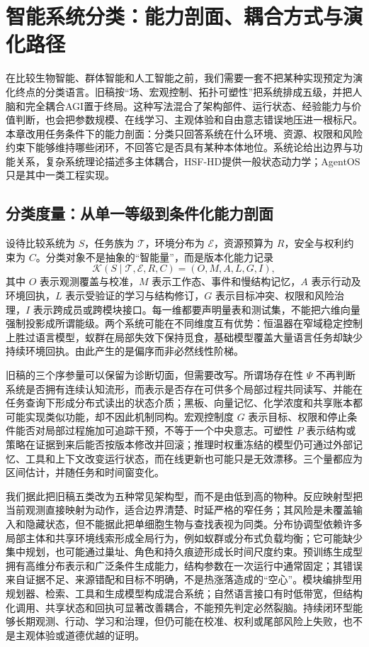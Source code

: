 \chapter{智能系统分类：能力剖面、耦合方式与演化路径}
\label{chp:evolutionary_taxonomy}

在比较生物智能、群体智能和人工智能之前，我们需要一套不把某种实现预定为演化终点的分类语言。旧稿按“场、宏观控制、拓扑可塑性”把系统排成五级，并把人脑和完全耦合AGI置于终局。这种写法混合了架构部件、运行状态、经验能力与价值判断，也会把参数规模、在线学习、主观体验和自由意志错误地压进一根标尺。本章改用任务条件下的能力剖面：分类只回答系统在什么环境、资源、权限和风险约束下能够维持哪些闭环，不回答它是否具有某种本体地位。系统论给出边界与功能关系，复杂系统理论描述多主体耦合，HSF-HD提供一般状态动力学；AgentOS只是其中一类工程实现。

\section{分类度量：从单一等级到条件化能力剖面}
\label{sec:section_1861}

设待比较系统为 $S$，任务族为 $\mathcal T$，环境分布为 $\mathcal E$，资源预算为 $R$，安全与权利约束为 $C$。分类对象不是抽象的“智能量”，而是版本化能力记录
\begin{equation}
 \mathcal K(S\mid\mathcal T,\mathcal E,R,C)=(O,M,A,L,G,I),
\end{equation}
其中 $O$ 表示观测覆盖与校准，$M$ 表示工作态、事件和慢结构记忆，$A$ 表示行动及环境回执，$L$ 表示受验证的学习与结构修订，$G$ 表示目标冲突、权限和风险治理，$I$ 表示跨成员或跨模块接口。每一维都要声明量表和测试集，不能把六维向量强制投影成所谓能级。两个系统可能在不同维度互有优势：恒温器在窄域稳定控制上胜过语言模型，蚁群在局部失效下保持觅食，基础模型覆盖大量语言任务却缺少持续环境回执。由此产生的是偏序而非必然线性阶梯。

旧稿的三个序参量可以保留为诊断切面，但需要改写。所谓场存在性 $\Psi$ 不再判断系统是否拥有连续认知流形，而表示是否存在可供多个局部过程共同读写、并能在任务查询下形成分布式读出的状态介质；黑板、向量记忆、化学浓度和共享账本都可能实现类似功能，却不因此机制同构。宏观控制度 $G$ 表示目标、权限和停止条件能否对局部过程施加可追踪干预，不等于一个中央意志。可塑性 $P$ 表示结构或策略在证据到来后能否按版本修改并回滚；推理时权重冻结的模型仍可通过外部记忆、工具和上下文改变运行状态，而在线更新也可能只是无效漂移。三个量都应为区间估计，并随任务和时间窗变化。

我们据此把旧稿五类改为五种常见架构型，而不是由低到高的物种。反应映射型把当前观测直接映射为动作，适合边界清楚、时延严格的窄任务；其风险是未覆盖输入和隐藏状态，但不能据此把单细胞生物与查找表视为同类。分布协调型依赖许多局部主体和共享环境线索形成全局行为，例如蚁群或分布式负载均衡；它可能缺少集中规划，也可能通过巢址、角色和持久痕迹形成长时间尺度约束。预训练生成型拥有高维分布表示和广泛条件生成能力，结构参数在一次运行中通常固定；其错误来自证据不足、来源错配和目标不明确，不是热涨落造成的“空心”。模块编排型用规划器、检索、工具和生成模型构成混合系统；自然语言接口有时低带宽，但结构化调用、共享状态和回执可显著改善耦合，不能预先判定必然裂脑。持续闭环型能够长期观测、行动、学习和治理，但仍可能在校准、权利或尾部风险上失败，也不是主观体验或道德优越的证明。

